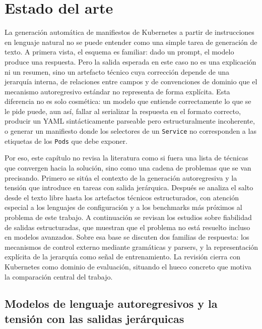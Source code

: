 %
\chapter{Estado del arte}
\label{ch::chapter2}

La generación automática de manifiestos de Kubernetes a partir de instrucciones en lenguaje natural no se puede entender como una simple tarea de generación de texto. A primera vista, el esquema es familiar: dado un prompt, el modelo produce una respuesta. Pero la salida esperada en este caso no es una explicación ni un resumen, sino un artefacto técnico cuya corrección depende de una jerarquía interna, de relaciones entre campos y de convenciones de dominio que el mecanismo autoregresivo estándar no representa de forma explícita. Esta diferencia no es solo cosmética: un modelo que entiende correctamente lo que se le pide puede, aun así, fallar al serializar la respuesta en el formato correcto, producir un YAML sintácticamente parseable pero estructuralmente incoherente, o generar un manifiesto donde los selectores de un \texttt{Service} no corresponden a las etiquetas de los \texttt{Pods} que debe exponer.

Por eso, este capítulo no revisa la literatura como si fuera una lista de técnicas que convergen hacia la solución, sino como una cadena de problemas que se van precisando. Primero se sitúa el contexto de la generación autoregresiva y la tensión que introduce en tareas con salida jerárquica. Después se analiza el salto desde el texto libre hasta los artefactos técnicos estructurados, con atención especial a los lenguajes de configuración y a los benchmarks más próximos al problema de este trabajo. A continuación se revisan los estudios sobre fiabilidad de salidas estructuradas, que muestran que el problema no está resuelto incluso en modelos avanzados. Sobre esa base se discuten dos familias de respuesta: los mecanismos de control externo mediante gramáticas y parsers, y la representación explícita de la jerarquía como señal de entrenamiento. La revisión cierra con Kubernetes como dominio de evaluación, situando el hueco concreto que motiva la comparación central del trabajo.

\section{Modelos de lenguaje autoregresivos y la tensión con las salidas jerárquicas}
\label{sec:estado-arte-llm-autoregresivos}

